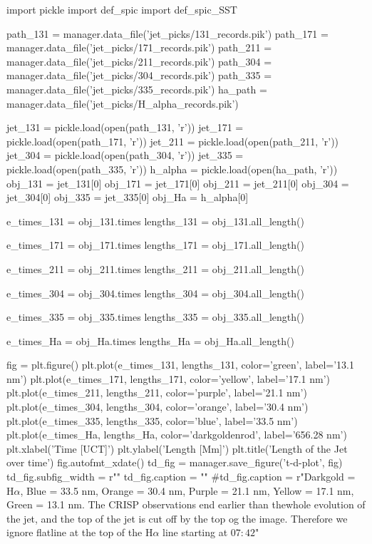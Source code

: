 \documentclass{emulateapj}
\begin{document}
\begin{pycode}[T-D-plots]
import pickle
import def_spic
import def_spic_SST

path_131 = manager.data_file('jet_picks/131_records.pik')
path_171 = manager.data_file('jet_picks/171_records.pik')
path_211 = manager.data_file('jet_picks/211_records.pik')
path_304 = manager.data_file('jet_picks/304_records.pik')
path_335 = manager.data_file('jet_picks/335_records.pik')
ha_path = manager.data_file('jet_picks/H_alpha_records.pik')

jet_131 = pickle.load(open(path_131, 'r'))
jet_171 = pickle.load(open(path_171, 'r'))
jet_211 = pickle.load(open(path_211, 'r'))
jet_304 = pickle.load(open(path_304, 'r'))
jet_335 = pickle.load(open(path_335, 'r'))
h_alpha = pickle.load(open(ha_path, 'r'))
obj_131 = jet_131[0]
obj_171 = jet_171[0]
obj_211 = jet_211[0]
obj_304 = jet_304[0]
obj_335 = jet_335[0]
obj_Ha = h_alpha[0]

e_times_131 = obj_131.times
lengths_131 = obj_131.all_length()

e_times_171 = obj_171.times
lengths_171 = obj_171.all_length()

e_times_211 = obj_211.times
lengths_211 = obj_211.all_length()

e_times_304 = obj_304.times
lengths_304 = obj_304.all_length()

e_times_335 = obj_335.times
lengths_335 = obj_335.all_length()

e_times_Ha = obj_Ha.times
lengths_Ha = obj_Ha.all_length()

fig = plt.figure()
plt.plot(e_times_131, lengths_131, color='green', label='13.1 nm')
plt.plot(e_times_171, lengths_171, color='yellow', label='17.1 nm')
plt.plot(e_times_211, lengths_211, color='purple', label='21.1 nm')
plt.plot(e_times_304, lengths_304, color='orange', label='30.4 nm')
plt.plot(e_times_335, lengths_335, color='blue', label='33.5 nm')
plt.plot(e_times_Ha, lengths_Ha, color='darkgoldenrod', label='656.28 nm')
plt.xlabel('Time [UCT]')
plt.ylabel('Length [Mm]')
plt.title('Length of the Jet over time')
fig.autofmt_xdate()
td_fig = manager.save_figure('t-d-plot', fig)
td_fig.subfig_width = r"\columnwidth"
td_fig.caption = ""
#td_fig.caption = r"Darkgold = H$\alpha$, Blue = 33.5 nm, Orange = 30.4 nm, Purple = 21.1 nm, Yellow = 17.1 nm, Green = 13.1 nm. The CRISP observations end earlier than thewhole evolution of the jet, and the top of the jet is cut off by the top og the image. Therefore we ignore flatline at the top of the H$\alpha$ line starting at $07:42$"
\end{pycode}
\end{document}
